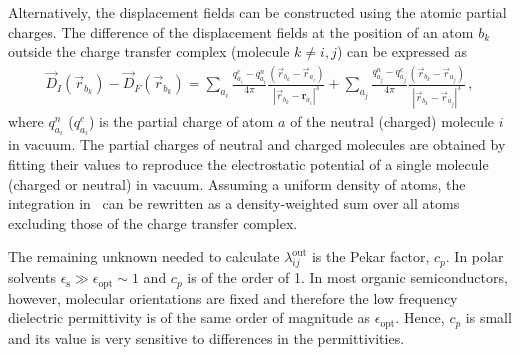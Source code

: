 Alternatively, the displacement fields can be constructed using the atomic partial charges. The difference of the displacement fields at the position of an atom $b_k$ outside the charge transfer complex (molecule $k \ne i,j$)  can be expressed as
\begin{eqnarray}
\label{equ:disp_atom}
\vec{D}_I(\vec{r}_{b_k}) - \vec{D}_F(\vec{r}_{b_k})  = 
\sum_{a_i} \frac{q_{a_i}^c - q_{a_i}^n}{4\pi } \frac{ (\vec{r}_{b_k} - \vec{r}_{a_i} ) }
                                            {|\vec{r}_{b_k}-\bm{r}_{a_i}|^3}+
\sum_{a_j} \frac{q_{a_j}^n - q_{a_j}^c}{4\pi } \frac{ (\vec{r}_{b_k}-\vec{r}_{a_j} ) } 
                                            {|\vec{r}_{b_k}-\vec{r}_{a_j}|^3}\,,
\end{eqnarray}
where $q^n_{a_i}$ ($q^c_{a_i}$) is the partial charge of atom $a$ of the neutral (charged) molecule $i$ in vacuum. The partial charges of neutral and charged molecules are obtained by fitting their values to reproduce the electrostatic potential of a single molecule (charged or neutral) in vacuum. 
%
Assuming a uniform density of atoms, the integration in~ can be rewritten as a density-weighted sum over all atoms excluding those of the charge transfer complex.

The remaining unknown needed to calculate $\lambda_{ij}^\text{out}$ is the Pekar factor, $c_p$. In polar solvents $\epsilon_\text{s}\gg\epsilon_\text{opt}\sim 1$ and $c_p$ is of the order of 1. In most organic semiconductors, however, molecular orientations are fixed and therefore the low frequency dielectric permittivity is of the same order of magnitude as $\epsilon_\text{opt}$. Hence, $c_p$ is small and its value is very sensitive to differences in the permittivities. 

